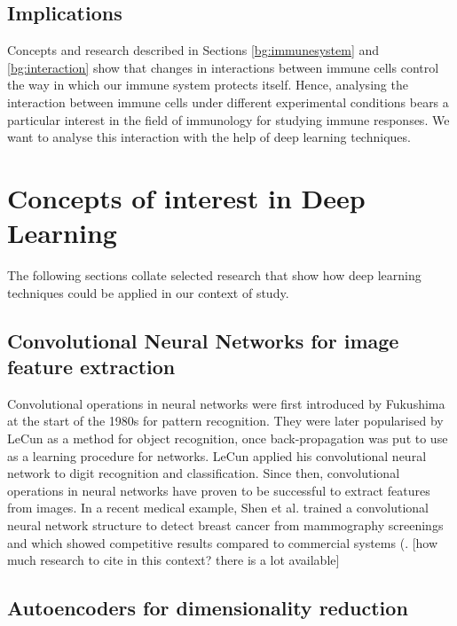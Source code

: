 \subsection{Implications}

Concepts and research described in Sections \ref{bg:immunesystem} and \ref{bg:interaction} show that changes in interactions between immune cells control the way in which our immune system protects itself. Hence, analysing the interaction between immune cells under different experimental conditions bears a particular interest in the field of immunology for studying immune responses. We want to analyse this interaction with the help of deep learning techniques.

\section{Concepts of interest in Deep Learning}

The following sections collate selected research that show how deep learning techniques could be applied in our context of study.

\subsection{Convolutional Neural Networks for image feature extraction}

Convolutional operations in neural networks were first introduced by Fukushima at the start of the 1980s for pattern recognition. They were later popularised by LeCun as a method for object recognition, once back-propagation was put to use as a learning procedure for networks. LeCun applied his convolutional neural network to digit recognition and classification. Since then, convolutional operations in neural networks have proven to be successful to extract features from images. In a recent medical example, Shen et al. trained a convolutional neural network structure to detect breast cancer from mammography screenings and which showed competitive results compared to commercial systems (\cite{https://www.nature.com/articles/s41598-019-48995-4}.
[how much research to cite in this context? there is a lot available]

\subsection{Autoencoders for dimensionality reduction}


